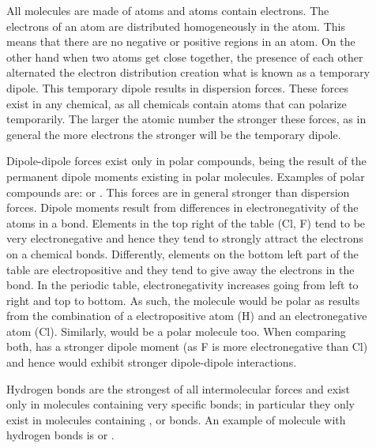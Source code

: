 \documentclass[main.tex]{subfiles}
\begin{document}
\sloppy 
\begin{description}
\item[] All molecules are made of atoms and atoms contain electrons. The electrons of an atom are distributed homogeneously in the atom. This means that there are no negative or positive regions in an atom. On the other hand when two atoms get close together, the presence of each other alternated the electron distribution creation what is known as a temporary dipole. This temporary dipole results in dispersion forces. These forces exist in any chemical, as all chemicals contain atoms that can polarize temporarily. The larger the atomic number the stronger these forces, as in general the more electrons the stronger will be the temporary dipole.
\item[] Dipole-dipole forces exist only in polar compounds, being the result of the permanent dipole moments existing in polar molecules. Examples of polar compounds are:  or . This forces are in general stronger than dispersion forces. Dipole moments result from differences in electronegativity of the atoms in a bond. Elements in the top right of the table (Cl, F) tend to be very electronegative and hence they tend to strongly attract the electrons on a chemical bonds. Differently, elements on the bottom left part of the table are electropositive and they tend to give away the electrons in the bond. In the periodic table, electronegativity increases going from left to right and top to bottom. As such, the molecule  would be polar as results from the combination of a electropositive atom (H) and an electronegative atom (Cl). Similarly,  would be a polar molecule too. When comparing both,  has a stronger dipole moment (as F is more electronegative than Cl) and hence would exhibit stronger dipole-dipole interactions.
\item[] Hydrogen bonds are the strongest of all intermolecular forces and exist only in molecules containing very specific bonds; in particular they only exist in molecules containing ,  or  bonds. An example of molecule with hydrogen bonds is  or .


\end{description}
\end{document}
